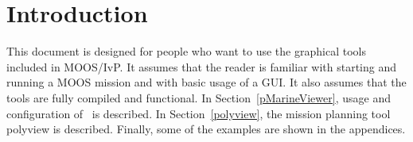 \section{Introduction}
\label{into}
This document is designed for people who want to use the graphical tools included in MOOS/IvP.  It assumes that the reader is familiar with starting and running a MOOS mission and with basic usage of a GUI.  It also assumes that the tools are fully compiled and functional.  In Section~\ref{pMarineViewer}, usage and configuration of \pmv\ is described.  In Section~\ref{polyview}, the mission planning tool polyview is described.  Finally, some of the examples are shown in the appendices.
